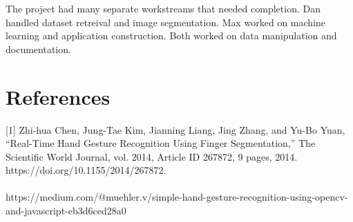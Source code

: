\documentclass[twocolumn]{article}
\begin{document}
The project had many separate workstreams that needed completion.
Dan handled dataset retreival and image segmentation.
Max worked on machine learning and application construction.
Both worked on data manipulation and documentation.


\section{References}
        [1]  Zhi-hua Chen, Jung-Tae Kim, Jianning Liang, Jing Zhang, and Yu-Bo Yuan, “Real-Time Hand Gesture Recognition Using Finger Segmentation,” The Scientific World Journal, vol. 2014, Article ID 267872, 9 pages, 2014. https://doi.org/10.1155/2014/267872.\\\\
        [2]  https://medium.com/@muehler.v/simple-hand-gesture-recognition-using-opencv-and-javascript-eb3d6ced28a0\\\\
\end{document}

